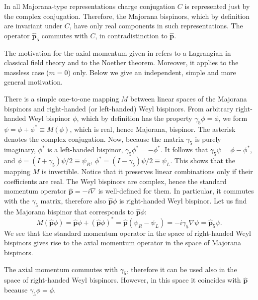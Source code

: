 \documentclass[12pt]{article}
\begin{document}
In all Majorana-type representations  charge conjugation $C$ is represented   just by the complex conjugation.  Therefore, the Majorana bispinors, which by definition are  invariant  under $C$, have only real  components in such representations. The operator  $\hat{\mathbf{p}}_5$  commutes with $C$, in contradistinction to  $\hat{\mathbf{p}}$.

The motivation for the axial momentum given in \cite{10} refers to a Lagrangian in  classical field theory and to the Noether theorem.  Moreover,  it applies to the massless case ($m=0$) only.  Below we give an independent, simple and  more general motivation.  


 There is a simple one-to-one mapping $M$ between linear spaces of the Majorana  bispinors and  right-handed (or left-handed) Weyl bispinors.   From 
arbitrary right-handed Weyl bispinor $\phi$, which by definition has the  property $ \gamma_5 \phi = \phi$, we form $ \psi =  \phi + \phi^* \equiv M(\phi)$, which is real, hence  Majorana, bispinor. The asterisk denotes the complex conjugation.  Now, because  the matrix $\gamma_5$ is purely imaginary,   $\phi^*$  is a left-handed bispinor, $\gamma_5 \phi^*= - \phi^*$.  It follows that  $ \gamma_5 \psi =   \phi - \phi^*$,  and  $\phi = (I + \gamma_5)\psi/2 \equiv \psi_{R}$,  $\phi ^*= (I - \gamma_5)\psi/2 \equiv \psi_{L}$.   This shows that the mapping $M$  is invertible. Notice that  it preserves linear combinations  only if their coefficients are real.
  The Weyl bispinors are complex, hence  the standard momentum operator $\hat{\mathbf{p}} = - i \nabla$ is well-defined for them. In particular, it  commutes with the $\gamma_5$ matrix, therefore also  $\hat{\mathbf{p}}\phi$   is  right-handed Weyl  bispinor.
  Let us find the Majorana bispinor that corresponds to $\hat{\mathbf{p}}\phi$:   \[ M( \hat{\mathbf{p}}\phi)= \hat{\mathbf{p}} \phi  + (\hat{\mathbf{p}}\phi)^* = \hat{\mathbf{p}}( \psi_R -  \psi_L) =  -i \gamma_5 \nabla \psi  = \hat{\mathbf{p}}_5 \psi.\] 
We see that the standard momentum operator in the  space of right-handed Weyl bispinors gives rise to the axial momentum operator in the space of Majorana bispinors. 

 The axial momentum  commutes with $\gamma_5$, therefore it can be used also in the space of right-handed Weyl bispinors. However,  in this space it coincides with $\hat{\mathbf{p}}$ because  $\gamma_5\phi= \phi$.     
\end{document}
